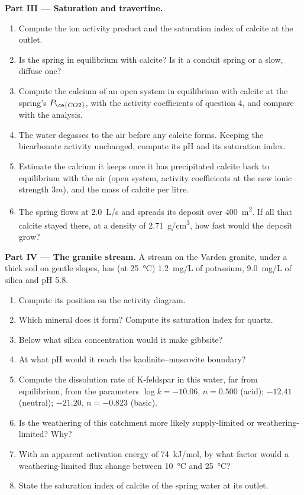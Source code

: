 \begin{problem}
\medskip\noindent\textbf{Part III --- Saturation and travertine.}
\begin{enumerate}[resume]
\item Compute the ion activity product and the saturation index of calcite
  at the outlet.
\item Is the spring in equilibrium with calcite? Is it a conduit spring or
  a slow, diffuse one?
\item Compute the calcium of an open system in equilibrium with calcite at
  the spring's $P_{\ce{CO2}}$, with the activity coefficients of question 4,
  and compare with the analysis.
\item The water degasses to the air before any calcite forms. Keeping the
  bicarbonate activity unchanged, compute its pH and its saturation index.
\item Estimate the calcium it keeps once it has precipitated calcite back to
  equilibrium with the air (open system, activity coefficients at the new
  ionic strength $3m$), and the mass of calcite per litre.
\item The spring flows at \qty{2.0}{L/s} and spreads its deposit over
  \qty{400}{m^2}. If all that calcite stayed there, at a density of
  \qty{2.71}{g/cm^3}, how fast would the deposit grow?
\end{enumerate}

\medskip\noindent\textbf{Part IV --- The granite stream.} A stream on the
Varden granite, under a thick soil on gentle slopes, has (at
\qty{25}{\celsius}) \qty{1.2}{mg/L} of potassium, \qty{9.0}{mg/L} of
silica and pH 5.8.
\begin{enumerate}[resume]
\item Compute its position on the activity diagram.
\item Which mineral does it form? Compute its saturation index for quartz.
\item Below what silica concentration would it make gibbsite?
\item At what pH would it reach the kaolinite--muscovite boundary?
\item Compute the dissolution rate of K-feldspar in this water, far from
  equilibrium, from the parameters $\log k = -10.06$, $n = 0.500$ (acid);
  $-12.41$ (neutral); $-21.20$, $n = -0.823$ (basic).
\item Is the weathering of this catchment more likely supply-limited or
  weathering-limited? Why?
\item With an apparent activation energy of \qty{74}{kJ/mol}, by what factor
  would a weathering-limited flux change between \qty{10}{\celsius} and
  \qty{25}{\celsius}?
\item State the saturation index of calcite of the spring water at its
  outlet.
\end{enumerate}
\end{problem}
